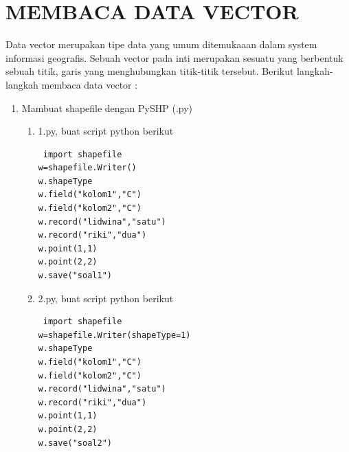 \section{MEMBACA DATA VECTOR}
Data vector merupakan tipe data yang umum ditemukaaan dalam system informasi geografis. Sebuah vector pada inti merupakan sesuatu yang berbentuk sebuah titik, garis yang menghubungkan titik-titik tersebut.
Berikut langkah-langkah membaca data vector :
\begin{enumerate}
\item Mambuat shapefile dengan PySHP (.py)
\begin{enumerate}
\item 1.py, buat script python berikut
\begin{lstlisting}
 import shapefile         
w=shapefile.Writer()
w.shapeType                 	
w.field("kolom1","C")
w.field("kolom2","C")
w.record("lidwina","satu")
w.record("riki","dua")
w.point(1,1)                  	  
w.point(2,2)
w.save("soal1")
\end{lstlisting}

\item 2.py, buat script python berikut
\begin{lstlisting}
 import shapefile                                               	
w=shapefile.Writer(shapeType=1)       	 
w.shapeType                                                                             	
w.field("kolom1","C")                                      	
w.field("kolom2","C")                                      	
w.record("lidwina","satu")                               	
w.record("riki","dua")                          	
w.point(1,1)                                          	
w.point(2,2)
w.save("soal2")
\end{lstlisting}
\end{enumerate}
\end{enumerate}